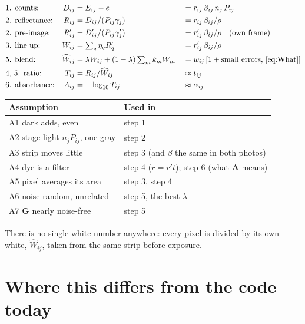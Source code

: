\documentclass[11pt,letter]{article}
\newcommand{\iG}{\mathbf{G}}   %
\newcommand{\iA}{\mathbf{A}}   %
\newcommand{\Lten}{\log_{10}}
\begin{document}
\begin{align*}
  &\text{1. counts:}       & D_{ij} &= E_{ij} - e
     &&= r_{ij}\, \beta_{ij}\, n_j\, P_{ij} \\
  &\text{2. reflectance:}  & R_{ij} &= D_{ij} \big/ (P_{ij}\gamma_j)
     &&= r_{ij}\, \beta_{ij} / \rho \\
  &\text{2. pre-image:}    & R'_{ij} &= D'_{ij} \big/ (P_{ij}\gamma'_j)
     &&= r'_{ij}\, \beta_{ij} / \rho \quad\text{(own frame)} \\
  &\text{3. line up:}      & W_{ij} &= \textstyle\sum_q \eta_q R'_q
     &&= r'_{ij}\, \beta_{ij} / \rho \\
  &\text{5. blend:}        & \widehat W_{ij} &= \lambda W_{ij}
     + (1-\lambda)\textstyle\sum_m k_m W_m
     &&= w_{ij}\,[1 + \text{small errors, \eqref{eq:What}}] \\
  &\text{4, 5. ratio:}     & T_{ij} &= R_{ij} / \widehat W_{ij}
     &&\approx t_{ij} \\
  &\text{6. absorbance:}   & A_{ij} &= -\Lten T_{ij}
     &&\approx \alpha_{ij}
\end{align*}

\medskip
\begin{tabular}{@{}lL{8.4cm}@{}}
\toprule
Assumption & Used in \\
\midrule
A1 dark adds, even & step 1 \\
A2 stage light $n_j P_{ij}$, one gray & step 2 \\
A3 strip moves little & step 3 (and $\beta$ the same in both photos) \\
A4 dye is a filter & step 4 ($r = r't$); step 6 (what $\iA$ means) \\
A5 pixel averages its area & step 3, step 4 \\
A6 noise random, unrelated & step 5, the best $\lambda$ \\
A7 $\iG$ nearly noise-free & step 5 \\
\bottomrule
\end{tabular}

\medskip
\noindent There is no single white number anywhere: every pixel is divided
by its own white, $\widehat W_{ij}$, taken from the same strip before
exposure.

\section{Where this differs from the code today}
\label{sec:code}
\end{document}
